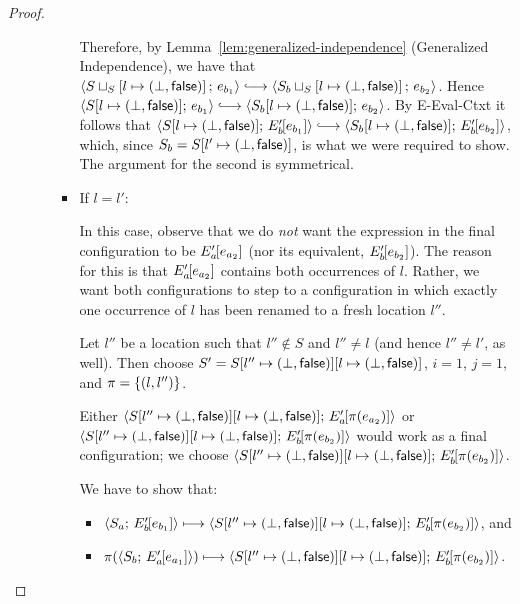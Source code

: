 \begin{proof}
\begin{enumerate}
\begin{enumerate}
\begin{itemize}

          Therefore, by Lemma~\ref{lem:generalized-independence}
          (Generalized Independence), we have that
          $\config{\lubstore{S}{\store{\storebinding{l}{\bot}{\frozenfalse}}}}{e_{b_1}}
          \parstepsto
          \config{\lubstore{S_b}{\store{\storebinding{l}{\bot}{\frozenfalse}}}}{e_{b_2}}$.
          Hence $\config{\extS{S}{l}{\bot}{\frozenfalse}}{e_{b_1}}
          \parstepsto
          \config{\extS{S_b}{l}{\bot}{\frozenfalse}}{e_{b_2}}$.  By
                 {\sc E-Eval-Ctxt} it follows that
                 $\config{\extS{S}{l}{\bot}{\frozenfalse}}{\evalctxt{E'_b}{e_{b_1}}}
                 \parstepsto
                 \config{\extS{S_b}{l}{\bot}{\frozenfalse}}{\evalctxt{E'_b}{e_{b_2}}}$,
                 which, since $S_b =
                 S[l' \mapsto (\bot, \textsf{false})]$, is what we were
                 required to show.  The argument for the second is
                 symmetrical.

        \item If $l = l'$:

          In this case, observe that we do \emph{not} want the
          expression in the final configuration to be
          $E'_a\hspace{-1mm}\left[e_{a_2}\right]$ (nor its equivalent,
          $E'_b\hspace{-1mm}\left[e_{b_2}\right]$).  The reason for this is that
          $E'_a\hspace{-1mm}\left[e_{a_2}\right]$ contains both occurrences of $l$.
          Rather, we want both configurations to step to a
          configuration in which exactly one occurrence of $l$ has
          been renamed to a fresh location $l''$.

          Let $l''$ be a location such that $l'' \notin S$ and $l''
          \neq l$ (and hence $l'' \neq l'$, as well).  Then choose $S'
          = S[l'' \mapsto (\bot, \textsf{false})][l \mapsto (\bot, \textsf{false})]$, $i = 1$, $j =
          1$, and $\pi = \left\{(l, l'')\right\}$.

          Either
          $\langle S[l'' \mapsto (\bot, \textsf{false})][l \mapsto (\bot, \textsf{false})];\, E'_a\hspace{-1mm}\left[\pi(e_{a_2})\right] \rangle$
          or
          $\langle S[l'' \mapsto (\bot, \textsf{false})][l \mapsto (\bot, \textsf{false})];\, E'_b\hspace{-1mm}\left[\pi(e_{b_2})\right] \rangle$
          would work as a final configuration; we choose
          $\langle S[l'' \mapsto (\bot, \textsf{false})][l \mapsto (\bot, \textsf{false})];\, E'_b\hspace{-1mm}\left[\pi(e_{b_2})\right] \rangle$.

          We have to show that:
          \begin{itemize}
          \item
            $\langle S_a;\, E'_b\hspace{-1mm}\left[e_{b_1}\right] \rangle \longmapsto
            \langle S[l'' \mapsto (\bot, \textsf{false})][l \mapsto (\bot, \textsf{false})];\, E'_b\hspace{-1mm}\left[\pi(e_{b_2})\right] \rangle$,
            and
          \item
            $\pi(\langle S_b;\, E'_a\hspace{-1mm}\left[e_{a_1}\right] \rangle) \longmapsto
            \langle S[l'' \mapsto (\bot, \textsf{false})][l \mapsto (\bot, \textsf{false})];\, E'_b\hspace{-1mm}\left[\pi(e_{b_2})\right] \rangle$.
          \end{itemize}


\end{itemize}
\end{enumerate}
\end{enumerate}
\end{proof}
